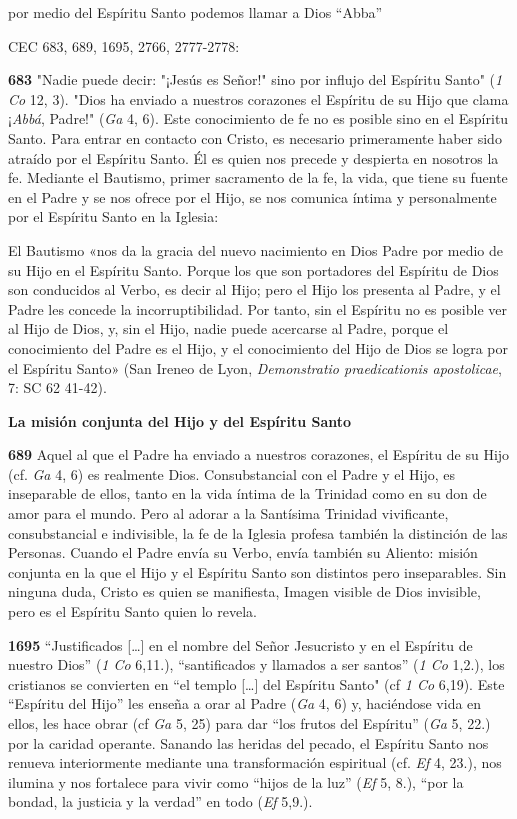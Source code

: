 \documentclass[]{article}
\begin{document}
por medio del Espíritu Santo podemos llamar a Dios ``Abba''

CEC 683, 689, 1695, 2766, 2777-2778:

\textbf{683} "Nadie puede decir: "¡Jesús es Señor!" sino por influjo del
Espíritu Santo" (\emph{1 Co} 12, 3). "Dios ha enviado a nuestros
corazones el Espíritu de su Hijo que clama ¡\emph{Abbá}, Padre!"
(\emph{Ga} 4, 6). Este conocimiento de fe no es posible sino en el
Espíritu Santo. Para entrar en contacto con Cristo, es necesario
primeramente haber sido atraído por el Espíritu Santo. Él es quien nos
precede y despierta en nosotros la fe. Mediante el Bautismo, primer
sacramento de la fe, la vida, que tiene su fuente en el Padre y se nos
ofrece por el Hijo, se nos comunica íntima y personalmente por el
Espíritu Santo en la Iglesia:

El Bautismo «nos da la gracia del nuevo nacimiento en Dios Padre por
medio de su Hijo en el Espíritu Santo. Porque los que son portadores del
Espíritu de Dios son conducidos al Verbo, es decir al Hijo; pero el Hijo
los presenta al Padre, y el Padre les concede la incorruptibilidad. Por
tanto, sin el Espíritu no es posible ver al Hijo de Dios, y, sin el
Hijo, nadie puede acercarse al Padre, porque el conocimiento del Padre
es el Hijo, y el conocimiento del Hijo de Dios se logra por el Espíritu
Santo» (San Ireneo de Lyon, \emph{Demonstratio praedicationis
apostolicae}, 7: SC 62 41-42).

\textbf{La misión conjunta del Hijo y del Espíritu Santo}

\textbf{689} Aquel al que el Padre ha enviado a nuestros corazones, el
Espíritu de su Hijo (cf. \emph{Ga} 4, 6) es realmente Dios.
Consubstancial con el Padre y el Hijo, es inseparable de ellos, tanto en
la vida íntima de la Trinidad como en su don de amor para el mundo. Pero
al adorar a la Santísima Trinidad vivificante, consubstancial e
indivisible, la fe de la Iglesia profesa también la distinción de las
Personas. Cuando el Padre envía su Verbo, envía también su Aliento:
misión conjunta en la que el Hijo y el Espíritu Santo son distintos pero
inseparables. Sin ninguna duda, Cristo es quien se manifiesta, Imagen
visible de Dios invisible, pero es el Espíritu Santo quien lo revela.

\textbf{1695} ``Justificados [\ldots{}] en el nombre del Señor Jesucristo
y en el Espíritu de nuestro Dios'' (\emph{1 Co} 6,11.), ``santificados y
llamados a ser santos'' (\emph{1 Co} 1,2.), los cristianos se convierten
en ``el templo [\ldots{}] del Espíritu Santo" (cf \emph{1 Co} 6,19). Este
``Espíritu del Hijo'' les enseña a orar al Padre (\emph{Ga} 4, 6) y,
haciéndose vida en ellos, les hace obrar (cf \emph{Ga} 5, 25) para dar
``los frutos del Espíritu'' (\emph{Ga} 5, 22.) por la caridad operante.
Sanando las heridas del pecado, el Espíritu Santo nos renueva
interiormente mediante una transformación espiritual (cf. \emph{Ef} 4,
23.), nos ilumina y nos fortalece para vivir como ``hijos de la luz''
(\emph{Ef} 5, 8.), ``por la bondad, la justicia y la verdad'' en todo
(\emph{Ef} 5,9.).
\end{document}
